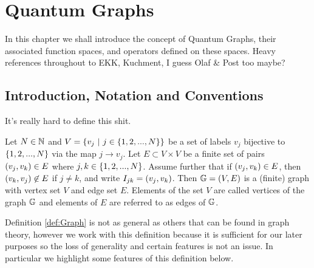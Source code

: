 \chapter{Quantum Graphs} \label{ch:QuantumGraphs}
In this chapter we shall introduce the concept of Quantum Graphs, their associated function spaces, and operators defined on these spaces.
Heavy references throughout to EKK, Kuchment, I guess Olaf \& Post too maybe?

\section{Introduction, Notation and Conventions}
It's really hard to define this shit.

\begin{definition}[Graph] \label{def:Graph}
	Let $N\in\mathbb{N}$ and $V=\clbracs{v_j \ \vert \ j\in\clbracs{1,2,...,N}}$ be a set of labels $v_j$ bijective to $\left\{ 1,2,...,N \right\}$ via the map $j\rightarrow v_j$.
	Let $E\subset V\times V$ be a finite set of pairs $\left( v_j,v_k \right)\in E$ where $j,k\in\left\{ 1,2,...,N \right\}$.
	Assume further that if $\left( v_j,v_k \right)\in E$, then $\left( v_k,v_j \right)\not\in E$ if $j\neq k$, and write $I_{jk} = \left( v_j,v_k \right)$.
	Then $\mathbb{G}=\left( V,E \right)$ is a (finite) graph with vertex set $V$ and edge set $E$.
	Elements of the set $V$ are called vertices of the graph $\mathbb{G}$ and elements of $E$ are referred to as edges of $\mathbb{G}$.	
\end{definition}
Definition \ref{def:Graph} is not as general as others that can be found in graph theory, however we work with this definition because it is sufficient for our later purposes so the loss of generality and certain features is not an issue.
In particular we highlight some features of this definition below.
